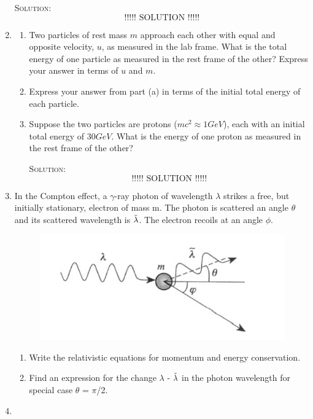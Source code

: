 \begin{enumerate}
\textsc{Solution:}\\
\[
\text{!!!!! SOLUTION !!!!!}
\]

\item \begin{enumerate}
    \item Two particles of rest mass $m$ approach each other with equal and opposite velocity, $u$, as measured in the lab frame. What is the total energy of one particle as measured in the rest frame of the other? Express your answer in terms of $u$ and $m$.
    
    \item Express your answer from part (a) in terms of the initial total energy of each particle.
    
    \item Suppose the two particles are protons ($mc^2 \approx 1 GeV$), each with an initial total energy of $30 GeV$. What is the energy of one proton as measured in the rest frame of the other?

\textsc{Solution:}\\
\[
\text{!!!!! SOLUTION !!!!!}
\]

\end{enumerate}
\item In the Compton effect, a $\gamma$-ray photon of wavelength $\lambda$ strikes a free, but initially stationary, electron of mass m. The photon is scattered an angle $\theta$ and its scattered wavelength is $\Tilde{\lambda}$. The electron recoils at an angle $\phi$.
\begin{figure}[htp]
    \centering
    \includegraphics{figures/modern/modern1.PNG}
    \caption{}
    \label{fig:my_label}
\end{figure}
\begin{enumerate}
    \item Write the relativistic equations for momentum and energy conservation.
    \item Find an expression for the change $\lambda$ - $\Tilde{\lambda}$ in the photon wavelength for special case $\theta$ = $\pi$/2. 
\end{enumerate}
\item 
\end{enumerate}